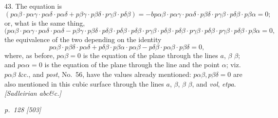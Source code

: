 \documentclass[11pt,a4paper]{book}
\begin{document}
43. The equation is
\[
(p\alpha\beta\cdot p\alpha\gamma\cdot p\alpha\delta\cdot p\alpha\delta + p\beta\gamma\cdot p\beta\delta\cdot p\gamma\beta\cdot p\delta\beta) = -bp\alpha\beta\cdot p\alpha\gamma\cdot p\alpha\delta\cdot p\beta\delta\cdot p\gamma\beta\cdot p\delta\beta\cdot p\beta\alpha = 0;
\]
or, what is the same thing,
\[
(p\alpha\beta\cdot p\alpha\gamma\cdot p\alpha\delta\cdot p\alpha\delta - p\beta\gamma\cdot p\beta\delta\cdot p\delta\beta\cdot p\delta\beta\cdot p\delta\beta\cdot p\gamma\beta\cdot p\delta\beta\cdot p\delta\beta\cdot p\gamma\beta\cdot p\delta\beta\cdot p\gamma\beta\cdot p\delta\beta\cdot p\beta\alpha = 0,
\]
the equivalence of the two depending on the identity
\[
p\alpha\beta\cdot p\beta\delta\cdot p\alpha\delta + p\delta\beta\cdot p\beta\alpha\cdot p\alpha\beta - p\delta\beta\cdot p\alpha\beta\cdot p\beta\delta = 0,
\]
where, as before, $p\alpha\beta = 0$ is the equation of the plane through the lines $a$, $\beta$ $\beta$;
and $p\alpha\alpha = 0$ is the equation of the plane through the line and the point $\alpha$; viz.\
$p\alpha\beta$ \&c., and \textit{post}, No.\ 56, have the values already mentioned: $p\alpha\beta, p\beta\delta = 0$ are also
mentioned in this cubic surface through the lines $a$, $\beta$, $\beta$ $\beta$, and \textit{vol}, \textit{ etpa}.
\textit{[Sadleirian abc\&c.]}

\clearpage

\bigskip
\textit{p.~128 [503]}
\smallskip
\end{document}
